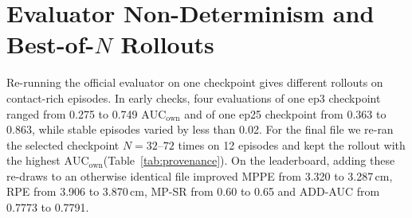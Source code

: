 \documentclass[10pt]{nvidiaextabstract}
\newcommand{\ownauc}{\ensuremath{\mathrm{AUC}_{\text{own}}}\xspace}
\begin{document}
\section{Evaluator Non-Determinism and Best-of-$N$ Rollouts}
\label{app:redraw}
Re-running the official evaluator on one checkpoint gives different rollouts on contact-rich episodes. In early checks, four evaluations of one ep3 checkpoint ranged from 0.275 to 0.749 \ownauc and of one ep25 checkpoint from 0.363 to 0.863, while stable episodes varied by less than 0.02. For the final file we re-ran the selected checkpoint $N=32$--$72$ times on 12 episodes and kept the rollout with the highest \ownauc (Table~\ref{tab:provenance}). On the leaderboard, adding these re-draws to an otherwise identical file improved MPPE from 3.320 to 3.287\,cm, RPE from 3.906 to 3.870\,cm, MP-SR from 0.60 to 0.65 and ADD-AUC from 0.7773 to 0.7791.
\end{document}
